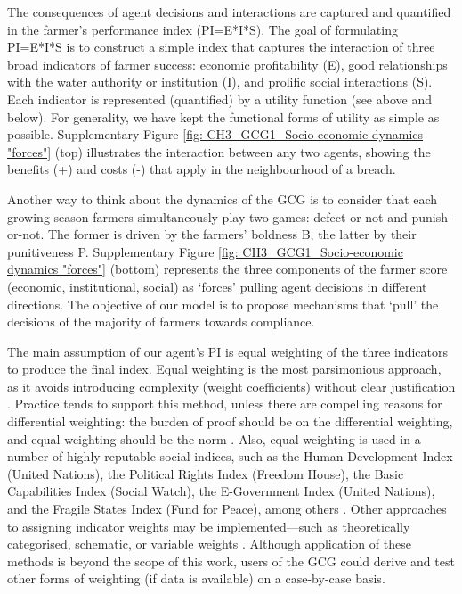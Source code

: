 \documentclass[12pt, a4paper]{article}
\begin{document}
The consequences of agent decisions and interactions are captured and quantified in the farmer’s performance index (PI=E*I*S). The goal of formulating PI=E*I*S is to construct a simple index that captures the interaction of three broad indicators of farmer success: economic profitability (E), good relationships with the water authority or institution (I), and prolific social interactions (S). Each indicator is represented (quantified) by a utility function (see above and below). For generality, we have kept the functional forms of utility as simple as possible. Supplementary Figure \ref{fig: CH3_GCG1_Socio-economic dynamics "forces"} (top) illustrates the interaction between any two agents, showing the benefits (+) and costs (-) that apply in the neighbourhood of a breach. 

Another way to think about the dynamics of the GCG is to consider that each growing season farmers simultaneously play two games: defect-or-not and punish-or-not. The former is driven by the farmers’ boldness B, the latter by their punitiveness P. Supplementary Figure \ref{fig: CH3_GCG1_Socio-economic dynamics "forces"} (bottom) represents the three components of the farmer score (economic, institutional, social) as ‘forces’ pulling agent decisions in different directions. The objective of our model is to propose mechanisms that ‘pull’ the decisions of the majority of farmers towards compliance. 

The main assumption of our agent’s PI is equal weighting of the three indicators to produce the final index. Equal weighting is the most parsimonious approach, as it avoids introducing complexity (weight coefficients) without clear justification \autocite{Chai:2009vz}. Practice tends to support this method, unless there are compelling reasons for differential weighting: the burden of proof should be on the differential weighting, and equal weighting should be the norm \autocite{Babbie:2010vh}. Also, equal weighting is used in a number of highly reputable social indices, such as the Human Development Index (United Nations), the Political Rights Index (Freedom House), the Basic Capabilities Index (Social Watch), the E-Government Index (United Nations), and the Fragile States Index (Fund for Peace), among others \autocite{Foa:2012jj}. Other approaches to assigning indicator weights may be implemented—such as theoretically categorised, schematic, or variable weights \autocite{Babbie:2010vh}. Although application of these methods is beyond the scope of this work, users of the GCG could derive and test other forms of weighting (if data is available) on a case-by-case basis. 
\end{document}
